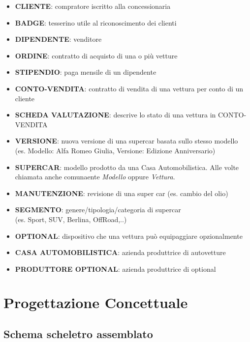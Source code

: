 \documentclass[12pt]{article}
\begin{document}
\begin{itemize}
    \item \textbf{CLIENTE}: compratore iscritto alla concessionaria
    \item \textbf{BADGE}: tesserino utile al riconoscimento dei clienti
    \item \textbf{DIPENDENTE}: venditore
    \item \textbf{ORDINE}: contratto di acquisto di una o più vetture
    \item \textbf{STIPENDIO}: paga mensile di un dipendente
    \item \textbf{CONTO-VENDITA}: contratto di vendita di una vettura per conto
    di un cliente
    \item \textbf{SCHEDA VALUTAZIONE}: descrive lo stato di una vettura in
    CONTO-VENDITA
    \item \textbf{VERSIONE}: nuova versione di una supercar basata sullo stesso
    modello\\ (es. Modello: Alfa Romeo Giulia, Versione: Edizione Anniversario)
    \item \textbf{SUPERCAR}: modello prodotto da una Casa Automobilistica. Alle
    volte chiamata anche comunaente \textit{Modello} oppure \textit{Vettura}.
    \item \textbf{MANUTENZIONE}: revisione di una super car (es. cambio del
    olio)
    \item \textbf{SEGMENTO}: genere/tipologia/categoria di supercar \\
    (es. Sport, SUV, Berlina, OffRoad,..)
    \item \textbf{OPTIONAL}: dispositivo che una vettura può equipaggiare
    opzionalmente    
    \item \textbf{CASA AUTOMOBILISTICA}: azienda produttrice di autovetture
    \item \textbf{PRODUTTORE OPTIONAL}: azienda produttrice di optional
\end{itemize}

\section{Progettazione Concettuale}

\subsection{Schema scheletro assemblato}
\end{document}
